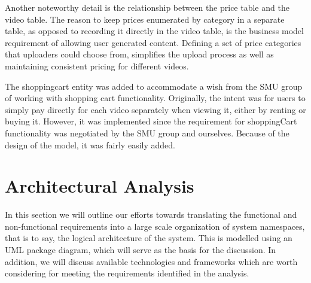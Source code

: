 Another noteworthy detail is the relationship between the price table and the video table. The reason to keep prices enumerated by category in a separate table, as opposed to recording it directly in the video table, is the business model requirement of allowing user generated content. Defining a set of price categories that uploaders could choose from, simplifies the upload process as well as maintaining consistent pricing for different videos.

The shoppingcart entity was added to accommodate a wish from the SMU group of working with shopping cart functionality. Originally, the intent was for users to simply pay directly for each video separately when viewing it, either by renting or buying it. However, it was implemented since the requirement for shoppingCart functionality was negotiated by the SMU group and ourselves. Because of the design of the model, it was fairly easily added.

\section{Architectural Analysis}
In this section we will outline our efforts towards translating the functional and non-functional requirements into a large scale organization of system namespaces, that is to say, the logical architecture of the system. This is modelled using an UML package diagram, which will serve as the basis for the discussion. In addition, we will discuss available technologies and frameworks which are worth considering for meeting the requirements identified in the analysis.

